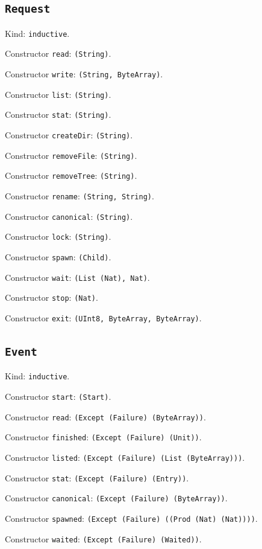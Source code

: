 \documentclass[11pt]{article}
\begin{document}
\subsection*{\texttt{Request}}
\noindent Kind: \texttt{inductive}.\par
\noindent Constructor \texttt{read}: \texttt{(String)}.\par
\noindent Constructor \texttt{write}: \texttt{(String, ByteArray)}.\par
\noindent Constructor \texttt{list}: \texttt{(String)}.\par
\noindent Constructor \texttt{stat}: \texttt{(String)}.\par
\noindent Constructor \texttt{createDir}: \texttt{(String)}.\par
\noindent Constructor \texttt{removeFile}: \texttt{(String)}.\par
\noindent Constructor \texttt{removeTree}: \texttt{(String)}.\par
\noindent Constructor \texttt{rename}: \texttt{(String, String)}.\par
\noindent Constructor \texttt{canonical}: \texttt{(String)}.\par
\noindent Constructor \texttt{lock}: \texttt{(String)}.\par
\noindent Constructor \texttt{spawn}: \texttt{(Child)}.\par
\noindent Constructor \texttt{wait}: \texttt{(List (Nat), Nat)}.\par
\noindent Constructor \texttt{stop}: \texttt{(Nat)}.\par
\noindent Constructor \texttt{exit}: \texttt{(UInt8, ByteArray, ByteArray)}.\par
\subsection*{\texttt{Event}}
\noindent Kind: \texttt{inductive}.\par
\noindent Constructor \texttt{start}: \texttt{(Start)}.\par
\noindent Constructor \texttt{read}: \texttt{(Except (Failure) (ByteArray))}.\par
\noindent Constructor \texttt{finished}: \texttt{(Except (Failure) (Unit))}.\par
\noindent Constructor \texttt{listed}: \texttt{(Except (Failure) (List (ByteArray)))}.\par
\noindent Constructor \texttt{stat}: \texttt{(Except (Failure) (Entry))}.\par
\noindent Constructor \texttt{canonical}: \texttt{(Except (Failure) (ByteArray))}.\par
\noindent Constructor \texttt{spawned}: \texttt{(Except (Failure) ((Prod (Nat) (Nat))))}.\par
\noindent Constructor \texttt{waited}: \texttt{(Except (Failure) (Waited))}.\par
\end{document}
